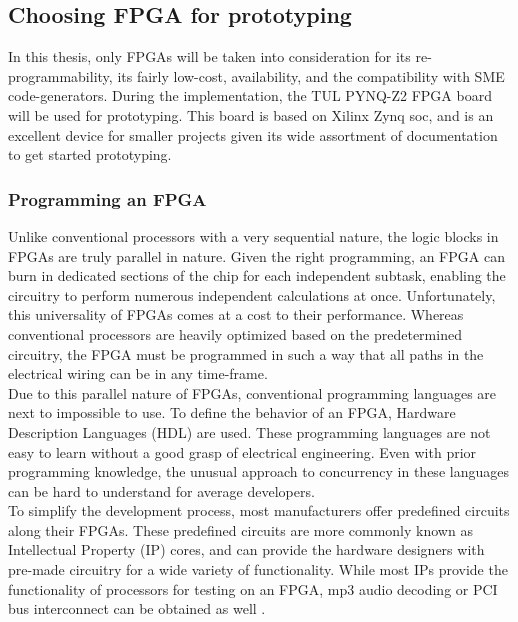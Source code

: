 \subsection{Choosing FPGA for prototyping}
In this thesis, only FPGAs will be taken into consideration for
its re-programmability, its fairly low-cost, availability, and the
compatibility with SME code-generators. During the implementation, the
TUL PYNQ\texttrademark-Z2 FPGA board will be used for prototyping. This
board is based on Xilinx Zynq \gls{soc}, and is an excellent device
for smaller projects given its wide assortment of documentation to get
started prototyping.\cite{tul_pynq}





\subsubsection{Programming an FPGA}
Unlike conventional processors with a very sequential nature, the logic blocks
in FPGAs are truly parallel in nature. Given the right programming, an FPGA can
burn in
dedicated sections of the chip for each independent subtask, enabling
the circuitry to perform numerous independent calculations at once\cite{ni_fpga}.
Unfortunately, this universality of FPGAs comes at a cost to their performance.
Whereas conventional processors are heavily optimized based on the predetermined
circuitry,
the FPGA must
be programmed in such a way that all paths in the electrical wiring can be
in any time-frame.
\\
Due to this parallel nature of FPGAs, conventional programming languages are
next to impossible to use. To define the behavior of an FPGA, Hardware
Description Languages (HDL) are used. These programming languages are not easy
to learn without a good grasp of electrical engineering. Even with prior
programming knowledge, the unusual approach to concurrency in these languages
can be hard to understand for average developers.\\
To simplify the development process, most manufacturers offer predefined
circuits along their FPGAs. These predefined circuits are more commonly known
as Intellectual Property (IP) cores, and can provide the hardware designers
with pre-made circuitry for a wide variety of functionality. While most IPs
provide the functionality of processors for testing\cite{intel_ip_core_80186EC}
on an FPGA, mp3 audio decoding or PCI bus interconnect can be obtained as
well\cite{fpga_for_dummies} .



